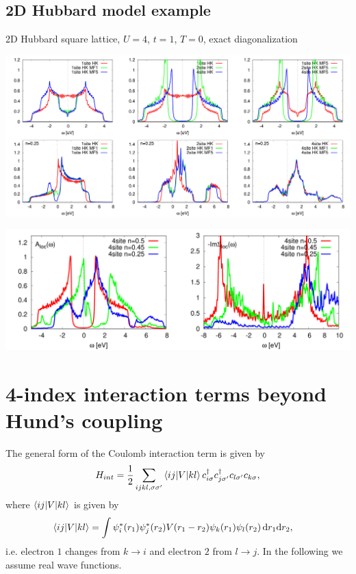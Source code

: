 \documentclass[12pt,a4paper]{scrartcl}
\numberwithin{equation}{section}
\begin{document}
\subsection{2D Hubbard model example}
2D Hubbard square lattice, $U=4$, $t=1$, $T=0$, exact diagonalization

\includegraphics[width=1\textwidth]{HatsugaiKohmoto/2D_HK.pdf}

\includegraphics[width=1\textwidth]{HatsugaiKohmoto/2D_HK_doping.pdf}

\clearpage


\section{4-index interaction terms beyond Hund's coupling}
The general form of the Coulomb interaction term is given by
\begin{align}
 H_{int} = \frac{1}{2}\sum_{ijkl,\sigma\sigma'} \braket{ij|V|kl} c^{\dagger}_{i\sigma} c^{\dagger}_{j\sigma'} c_{l\sigma'} c_{k\sigma},
\end{align}
where $\braket{ij|V|kl}$ is given by
\begin{align}
 \braket{ij|V|kl}
 &= \int \psi^*_i(r_1) \psi^*_j(r_2) V(r_1-r_2) \psi_k(r_1) \psi_l(r_2) \, \mathrm{d}r_1\mathrm{d}r_2,
\end{align}
i.e. electron $1$ changes from $k\rightarrow i$ and electron $2$ from $l\rightarrow j$.
In the following we assume real wave functions.
\end{document}
